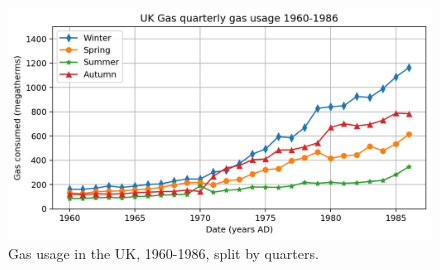 \documentclass[a4paper, openany]{memoir}
\begin{document}
\begin{figure}[H]
    \centering
    \includegraphics[scale=0.4]{src/2.18 Gas Example Plot 3.png}
    \caption{Gas usage in the UK, 1960-1986, split by quarters.}
\end{figure}
\newpage
\end{document}
